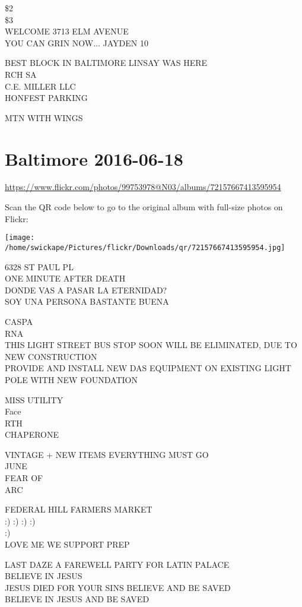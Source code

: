 \documentclass[10pt,letterpaper]{article}
\begin{document}
\$2\\
\$3\\
WELCOME 3713 ELM AVENUE\\
YOU CAN GRIN NOW... JAYDEN 10

BEST BLOCK IN BALTIMORE LINSAY WAS HERE\\
RCH SA\\
C.E. MILLER LLC\\
HONFEST PARKING

MTN WITH WINGS


\section*{Baltimore 2016-06-18}

\url{https://www.flickr.com/photos/99753978@N03/albums/72157667413595954}

Scan the QR code below to go to the original album with full-size photos on Flickr:

\texttt{[image: /home/swickape/Pictures/flickr/Downloads/qr/72157667413595954.jpg]}


6328 ST PAUL PL\\
ONE MINUTE AFTER DEATH\\
DONDE VAS A PASAR LA ETERNIDAD?\\
SOY UNA PERSONA BASTANTE BUENA

CASPA\\
RNA\\
THIS LIGHT STREET BUS STOP SOON WILL BE ELIMINATED, DUE TO NEW CONSTRUCTION\\
PROVIDE AND INSTALL NEW DAS EQUIPMENT ON EXISTING LIGHT POLE WITH NEW FOUNDATION

MISS UTILITY\\
Face\\
RTH\\
CHAPERONE

VINTAGE + NEW ITEMS EVERYTHING MUST GO\\
JUNE\\
FEAR OF\\
ARC

FEDERAL HILL FARMERS MARKET\\
:) :) :) :)\\
:)\\
LOVE ME WE SUPPORT PREP

LAST DAZE A FAREWELL PARTY FOR LATIN PALACE\\
BELIEVE IN JESUS\\
JESUS DIED FOR YOUR SINS BELIEVE AND BE SAVED\\
BELIEVE IN JESUS AND BE SAVED
\end{document}
